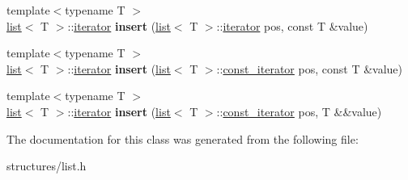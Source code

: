 \begin{DoxyCompactItemize}
\item 
\mbox{\label{classmystl_1_1list_ac32de60a6c823d6a92567118af2e2e99}} 
{\footnotesize template$<$typename T $>$ }\\\hyperlink{classmystl_1_1list}{list}$<$ T $>$\+::\hyperlink{classmystl_1_1list_1_1iterator}{iterator} {\bfseries insert} (\hyperlink{classmystl_1_1list}{list}$<$ T $>$\+::\hyperlink{classmystl_1_1list_1_1iterator}{iterator} pos, const T \&value)
\item 
\mbox{\label{classmystl_1_1list_ae8602c3de493b0fc0cceeae2f1f0d776}} 
{\footnotesize template$<$typename T $>$ }\\\hyperlink{classmystl_1_1list}{list}$<$ T $>$\+::\hyperlink{classmystl_1_1list_1_1iterator}{iterator} {\bfseries insert} (\hyperlink{classmystl_1_1list}{list}$<$ T $>$\+::\hyperlink{classmystl_1_1list_1_1const__iterator}{const\+\_\+iterator} pos, const T \&value)
\item 
\mbox{\label{classmystl_1_1list_a5acc30a56ceec98f9249aec24231a8c3}} 
{\footnotesize template$<$typename T $>$ }\\\hyperlink{classmystl_1_1list}{list}$<$ T $>$\+::\hyperlink{classmystl_1_1list_1_1iterator}{iterator} {\bfseries insert} (\hyperlink{classmystl_1_1list}{list}$<$ T $>$\+::\hyperlink{classmystl_1_1list_1_1const__iterator}{const\+\_\+iterator} pos, T \&\&value)
\end{DoxyCompactItemize}


The documentation for this class was generated from the following file\+:\begin{DoxyCompactItemize}
\item 
structures/list.\+h\end{DoxyCompactItemize}
